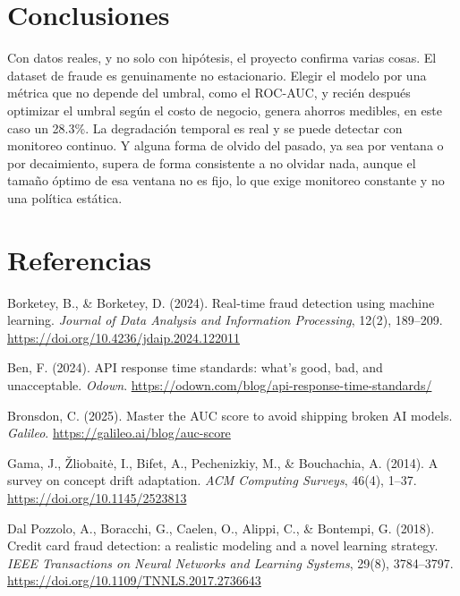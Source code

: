 \documentclass[10pt]{article}
\begin{document}
\section{Conclusiones}
Con datos reales, y no solo con hipótesis, el proyecto confirma varias cosas. El dataset de fraude es genuinamente no estacionario. Elegir el modelo por una métrica que no depende del umbral, como el ROC-AUC, y recién después optimizar el umbral según el costo de negocio, genera ahorros medibles, en este caso un 28.3\%. La degradación temporal es real y se puede detectar con monitoreo continuo. Y alguna forma de olvido del pasado, ya sea por ventana o por decaimiento, supera de forma consistente a no olvidar nada, aunque el tamaño óptimo de esa ventana no es fijo, lo que exige monitoreo constante y no una política estática.

\section{Referencias}
\begin{enumerate}[leftmargin=18pt, itemsep=3pt, label={[\arabic*]}]
  \item Borketey, B., \& Borketey, D. (2024). Real-time fraud detection using machine learning. \emph{Journal of Data Analysis and Information Processing}, 12(2), 189--209. \url{https://doi.org/10.4236/jdaip.2024.122011}
  \item Ben, F. (2024). API response time standards: what's good, bad, and unacceptable. \emph{Odown}. \url{https://odown.com/blog/api-response-time-standards/}
  \item Bronsdon, C. (2025). Master the AUC score to avoid shipping broken AI models. \emph{Galileo}. \url{https://galileo.ai/blog/auc-score}
  \item Gama, J., Žliobaitė, I., Bifet, A., Pechenizkiy, M., \& Bouchachia, A. (2014). A survey on concept drift adaptation. \emph{ACM Computing Surveys}, 46(4), 1--37. \url{https://doi.org/10.1145/2523813}
  \item Dal Pozzolo, A., Boracchi, G., Caelen, O., Alippi, C., \& Bontempi, G. (2018). Credit card fraud detection: a realistic modeling and a novel learning strategy. \emph{IEEE Transactions on Neural Networks and Learning Systems}, 29(8), 3784--3797. \url{https://doi.org/10.1109/TNNLS.2017.2736643}
\end{enumerate}
\end{document}

